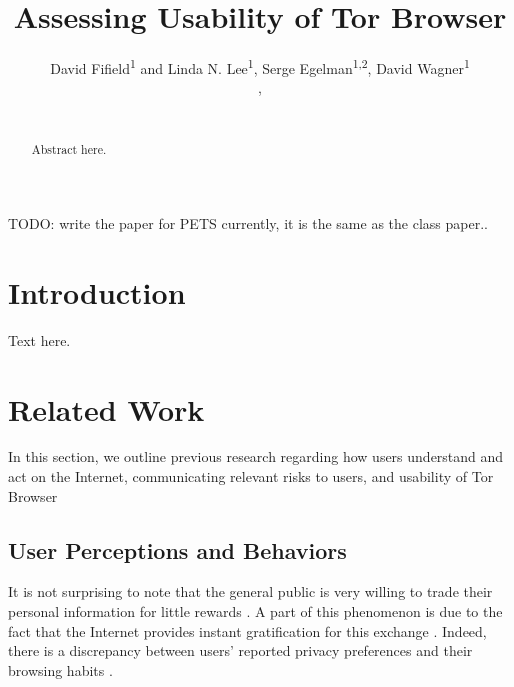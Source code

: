 \documentclass{sig-alternate-hotpets15}
\begin{document}
\title{Assessing Usability of Tor Browser}
\author{
 \alignauthor David Fifield\textsuperscript{1} and Linda N. Lee\textsuperscript{1}, Serge Egelman\textsuperscript{1,2}, David Wagner\textsuperscript{1}\\
   \vspace{0.5em}
   , \\
   \\
}

\maketitle
{\color {red} TODO: write the paper for PETS currently, it is the same as the class paper..}

\begin{abstract}
Abstract here.
\end{abstract}




\section{Introduction}

Text here.

\section{Related Work}
In this section, we outline previous research regarding how users understand and act on the Internet, communicating relevant risks to users, and usability of Tor Browser

\subsection{User Perceptions and Behaviors}
It is not surprising to note that the general public is very willing to trade their personal information for little rewards \cite{norberg2007privacy}. A part of this phenomenon is due to the fact that the Internet provides instant gratification for this exchange \cite{acquisti2004privacy}. Indeed, there is a discrepancy between users' reported privacy preferences and their browsing habits \cite{jensen2005privacy}. 
\end{document}
